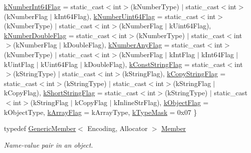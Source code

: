 \begin{DoxyCompactItemize}
\hyperlink{classGenericValue_a04e3cc12ba3721aad00063678d466912ad117eb41bb8015a76aadf6149bbd8ce5}{k\+Number\+Int64\+Flag} = static\+\_\+cast$<$int$>$(k\+Number\+Type) $\vert$ static\+\_\+cast$<$int$>$(k\+Number\+Flag $\vert$ k\+Int64\+Flag), 
\newline
\hyperlink{classGenericValue_a04e3cc12ba3721aad00063678d466912aaa1ee6a546d4db67f4bdef41d1f54f02}{k\+Number\+Uint64\+Flag} = static\+\_\+cast$<$int$>$(k\+Number\+Type) $\vert$ static\+\_\+cast$<$int$>$(k\+Number\+Flag $\vert$ k\+Uint64\+Flag), 
\hyperlink{classGenericValue_a04e3cc12ba3721aad00063678d466912a29bc91c155577923abd8f19aa050058b}{k\+Number\+Double\+Flag} = static\+\_\+cast$<$int$>$(k\+Number\+Type) $\vert$ static\+\_\+cast$<$int$>$(k\+Number\+Flag $\vert$ k\+Double\+Flag), 
\hyperlink{classGenericValue_a04e3cc12ba3721aad00063678d466912ab7805b1908fd181afc8d70fe07b17e18}{k\+Number\+Any\+Flag} = static\+\_\+cast$<$int$>$(k\+Number\+Type) $\vert$ static\+\_\+cast$<$int$>$(k\+Number\+Flag $\vert$ k\+Int\+Flag $\vert$ k\+Int64\+Flag $\vert$ k\+Uint\+Flag $\vert$ k\+Uint64\+Flag $\vert$ k\+Double\+Flag), 
\hyperlink{classGenericValue_a04e3cc12ba3721aad00063678d466912a5d26a84f26833eafd0028c0102a388a9}{k\+Const\+String\+Flag} = static\+\_\+cast$<$int$>$(k\+String\+Type) $\vert$ static\+\_\+cast$<$int$>$(k\+String\+Flag), 
\newline
\hyperlink{classGenericValue_a04e3cc12ba3721aad00063678d466912a10c83f7f191dce81bb0273adc0d838de}{k\+Copy\+String\+Flag} = static\+\_\+cast$<$int$>$(k\+String\+Type) $\vert$ static\+\_\+cast$<$int$>$(k\+String\+Flag $\vert$ k\+Copy\+Flag), 
\hyperlink{classGenericValue_a04e3cc12ba3721aad00063678d466912aca24fa09485fa10b17071509a985ff01}{k\+Short\+String\+Flag} = static\+\_\+cast$<$int$>$(k\+String\+Type) $\vert$ static\+\_\+cast$<$int$>$(k\+String\+Flag $\vert$ k\+Copy\+Flag $\vert$ k\+Inline\+Str\+Flag), 
\hyperlink{classGenericValue_a04e3cc12ba3721aad00063678d466912aba5811d4baeb56dc793a6510fe28748c}{k\+Object\+Flag} = k\+Object\+Type, 
\hyperlink{classGenericValue_a04e3cc12ba3721aad00063678d466912af7d99965ba807c718b482a9a7fb28b47}{k\+Array\+Flag} = k\+Array\+Type, 
\newline
\hyperlink{classGenericValue_a04e3cc12ba3721aad00063678d466912a793e0bc40e0abe1ed8bcb3e6fbba65c2}{k\+Type\+Mask} = 0x07
 \}
\item 
typedef \hyperlink{classGenericMember}{Generic\+Member}$<$ Encoding, Allocator $>$ \hyperlink{classGenericValue_a7ccf27c44058b4c11c3efc6473afb886}{Member}
\begin{DoxyCompactList}\small\item\em Name-\/value pair in an object. \end{DoxyCompactList}\item 

\end{DoxyCompactItemize}
